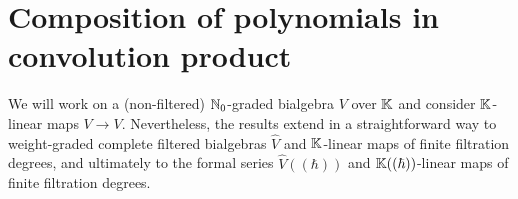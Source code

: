 \documentclass[\MainFolder/Text.tex]{subfiles}
\begin{document}

\section{Composition of polynomials in convolution product}\label{Sec:CompConvA}
\renewcommand{\Star}{*}
We will work on a (non-filtered) $\mathbb{N}_0$-graded bialgebra $V$ over $\mathbb{K}$ and consider $\mathbb{K}$-linear maps $V\rightarrow V$. Nevertheless, the results extend in a straightforward way to weight-graded complete filtered bialgebras $\hat{V}$ and $\mathbb{K}$-linear maps of finite filtration degrees, and ultimately to the formal series $\hat{V}((\hbar))$ and $\mathbb{K}((\hbar))$-linear maps of finite filtration degrees.
\end{document}
